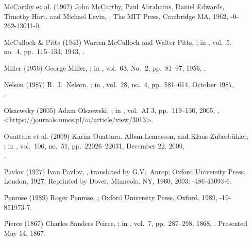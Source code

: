 \biblabel McCarthy et al. (1962)
John McCarthy, Paul Abrahams, Daniel Edwards,
Timothy Hart, and Michael Levin,
 ;
The MIT Press, Cambridge MA, 1962,
-0-262-13011-0.

\biblabel McCulloch \& Pitts (1943)
Warren McCulloch and Walter Pitts,
;
in ,
vol.\ 5, no.\ 4, pp.\ 115--133, 1943,
.

\biblabel Miller (1956)
 George Miller,
;
in ,
vol.\ 63, No.\ 2, pp.\ 81--97, 1956,
.

\biblabel Nelson (1987)
R.\ J.\ Nelson,
;
in ,
vol.\ 28, no.\ 4, pp.\ 581--614, October 1987,\\
.

\biblabel Olszewsky (2005)
Adam Olszewski,
;
in ,
vol.\ AI 3, pp.\ 119--130, 2005,
,
\URL<https://journals.umcs.pl/ai/article/view/3013>.

\biblabel Ouattara et al. (2009)
Karim Ouattara, Alban Lemasson, and Klaus Zuberbühler,\\
;
in ,
vol.\ 106, no.\ 51, pp.\ 22026--22031, December 22, 2009,\\
.

\biblabel Pavlov (1927)
Ivan Pavlov,
,
translated by G.V.\ Anrep;
Oxford University Press, London, 1927.
Reprinted by Dover, Minneola, NY, 1960, 2003;
-486-43093-6.

\biblabel Penrose (1989)
Roger Penrose, \negthinspace
{};
Oxford University Press, Oxford, 1989,
-19-851973-7.

\biblabel Pierce (1867)
Charles Sanders Peirce,
;
in ,
vol.\ 7, pp.\ 287--298, 1868,
.
Presented May 14, 1867.

